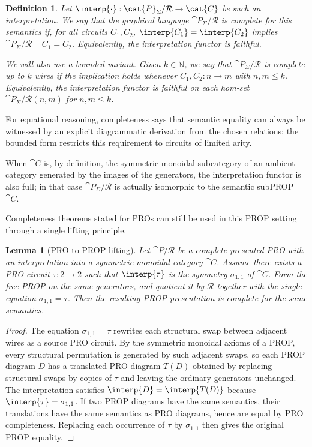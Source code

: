 \documentclass[10pt,a4paper]{article}
\newtheorem{lemma}[theorem]{Lemma}
\newtheorem{definition}[theorem]{Definition}
\begin{document}
\begin{definition}\label{def:semantic-completeness}
Let \(\interp{\cdot}:\cat{P}_\Sigma/\mathcal{R}\to\cat{C}\) be such an
interpretation.  We say that the graphical language \(\cat{P}_\Sigma/\mathcal{R}\)
is \emph{complete} for this semantics if, for all circuits \(C_1,C_2\), \(\interp{C_1}=\interp{C_2}\) implies
\(\cat{P}_\Sigma/\mathcal{R}\vdash C_1=C_2\).  Equivalently, the interpretation
functor is faithful.

We will also use a bounded variant. Given \(k\in\mathbb{N}\), we say that
\(\cat{P}_\Sigma/\mathcal{R}\) is \emph{complete up to \(k\) wires} if the
implication holds whenever \(C_1,C_2:n\to m\) with \(n,m\le k\).  Equivalently, the
interpretation functor is faithful on each hom-set
\(\cat{P}_\Sigma/\mathcal{R}(n,m)\) for \(n,m\le k\).
\end{definition}
For equational reasoning, completeness says that semantic equality can always be witnessed by an explicit
diagrammatic derivation from the chosen relations; the bounded form restricts this requirement to
circuits of limited arity.

When \(\cat{C}\) is, by definition, the symmetric monoidal subcategory of an
ambient category generated by the images of the generators, the interpretation
functor is also full; in that case \(\cat{P}_\Sigma/\mathcal{R}\) is actually
isomorphic to the semantic subPROP~\(\cat{C}\).

Completeness theorems stated for PROs can still be used in this PROP setting through a single
lifting principle.

\begin{lemma}[PRO-to-PROP lifting]\label{lem:fromprotoprop}\label{rem:fromprotoprop}
Let \(\cat{P}/\mathcal{R}\) be a complete presented PRO with an interpretation into a \emph{symmetric} monoidal category \(\cat{C}\). 
Assume there exists a PRO circuit
\(\tau:2\to 2\) such that \(\interp{\tau}\) is the symmetry \(\sigma_{1,1}\) of
\(\cat{C}\).
Form the free PROP on the same generators, and quotient it by \(\mathcal{R}\) together with the single equation
\(\sigma_{1,1}=\tau\).
Then the resulting PROP presentation is complete for the same semantics.
\end{lemma}
\begin{proof}
The equation \(\sigma_{1,1}=\tau\) rewrites each structural swap between adjacent wires as a source PRO circuit.
By the symmetric monoidal axioms of a PROP, every structural permutation is generated by such adjacent swaps,
so each PROP diagram \(D\) has a translated PRO diagram \(T(D)\) obtained by replacing structural swaps by copies of
\(\tau\) and leaving the ordinary generators unchanged.  The interpretation satisfies
\(\interp{D}=\interp{T(D)}\) because \(\interp{\tau}=\sigma_{1,1}\).  If two PROP diagrams have the same semantics,
their translations have the same semantics as PRO diagrams, hence are equal by PRO completeness.  Replacing
each occurrence of \(\tau\) by \(\sigma_{1,1}\) then gives the original PROP equality.
\end{proof}
\end{document}
